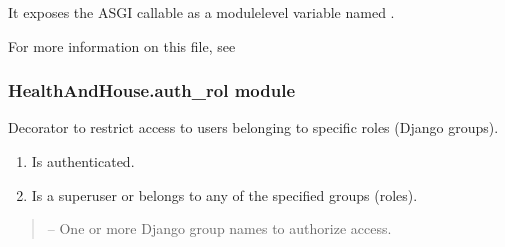 \documentclass[a4paper,11pt,spanish]{sphinxmanual}
\begin{document}
\sphinxAtStartPar
It exposes the ASGI callable as a module\sphinxhyphen{}level variable named .

\sphinxAtStartPar
For more information on this file, see

\sphinxstepscope


\subsubsection{HealthAndHouse.auth\_rol module}
\label{\detokenize{api/HealthAndHouse/HealthAndHouse.auth_rol:module-HealthAndHouse.auth_rol}}\label{\detokenize{api/HealthAndHouse/HealthAndHouse.auth_rol:healthandhouse-auth-rol-module}}\label{\detokenize{api/HealthAndHouse/HealthAndHouse.auth_rol::doc}}

\begin{fulllineitems}
\label{\detokenize{api/HealthAndHouse/HealthAndHouse.auth_rol:HealthAndHouse.auth_rol.has_role}}
\pysigstartsignatures
\pysiglinewithargsret
{}
{}
{}
\pysigstopsignatures
\sphinxAtStartPar
Decorator to restrict access to users belonging to specific roles (Django groups).
\begin{description}
\begin{enumerate}
%
\item {} 
\sphinxAtStartPar
Is authenticated.

\item {} 
\sphinxAtStartPar
Is a superuser or belongs to any of the specified groups (roles).

\end{enumerate}

\end{description}
\begin{quote}\begin{description}
\sphinxAtStartPar
{} – One or more Django group names to authorize access.

\sphinxAtStartPar


\end{description}\end{quote}

\end{fulllineitems}
\end{document}
